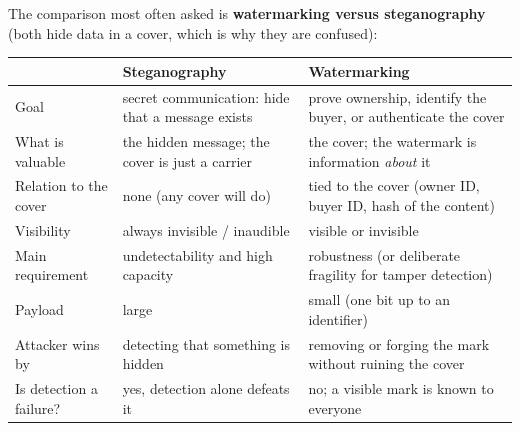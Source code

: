 The comparison most often asked is \textbf{watermarking versus steganography} (both hide data in a cover, which is why they are confused):
\begin{center}\small
\begin{tabularx}{\textwidth}{@{}l X X@{}}
\toprule
 & Steganography & Watermarking\\
\midrule
Goal & secret communication: hide that a message exists & prove ownership, identify the buyer, or authenticate the cover\\
What is valuable & the hidden message; the cover is just a carrier & the cover; the watermark is information \emph{about} it\\
Relation to the cover & none (any cover will do) & tied to the cover (owner ID, buyer ID, hash of the content)\\
Visibility & always invisible / inaudible & visible or invisible\\
Main requirement & undetectability and high capacity & robustness (or deliberate fragility for tamper detection)\\
Payload & large & small (one bit up to an identifier)\\
Attacker wins by & detecting that something is hidden & removing or forging the mark without ruining the cover\\
Is detection a failure? & yes, detection alone defeats it & no; a visible mark is known to everyone\\
\bottomrule
\end{tabularx}
\end{center}

